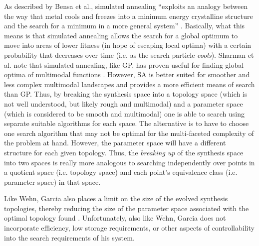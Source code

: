 \documentclass[12pt]{report} 	%
\numberwithin{figure}{chapter}
\numberwithin{table}{chapter}
\numberwithin{equation}{chapter}
\begin{document}
\begin{flushleft}
As described by Bensa et al., simulated annealing ``exploits an analogy between the way that metal cools and freezes into a minimum energy crystalline structure and the search for a minimum in a more general system'' \cite[p. 501]{Bensa:2005xq}. Basically, what this means is that simulated annealing allows the search for a global optimum to move into areas of lower fitness (in hope of escaping local optima) with a certain probability that decreases over time (i.e. as the search particle \textit{cools}). Sharman et al. note that simulated annealing, like GP, has proven useful for finding global optima of multimodal functions \cite[p. 1]{Sharman:1995bs}. However, SA is better suited for smoother and less complex multimodal landscapes and provides a more efficient means of search than GP. Thus, by breaking the synthesis space into a topology space (which is not well understood, but likely rough and multimodal) and a parameter space (which is considered to be smooth and multimodal) one is able to search using separate suitable algorithms for each space. The alternative is to have to choose one search algorithm that may not be optimal for the multi-faceted complexity of the problem at hand. However, the parameter space will have a different structure for each given topology. Thus, the \textit{breaking up} of the synthesis space into two spaces is really more analogous to searching independently over points in a quotient space (i.e. topology space) and each point's equivalence class (i.e. parameter space) in that space.

Like Wehn, Garcia also places a limit on the size of the evolved synthesis topologies, thereby reducing the size of the parameter space associated with the optimal topology found \cite[p. 87]{Garcia:2001jw}. Unfortunately, also like Wehn, Garcia does not incorporate 
efficiency, low storage requirements, or other aspects of controllability into the search requirements of his system.


\end{flushleft}
\end{document}
